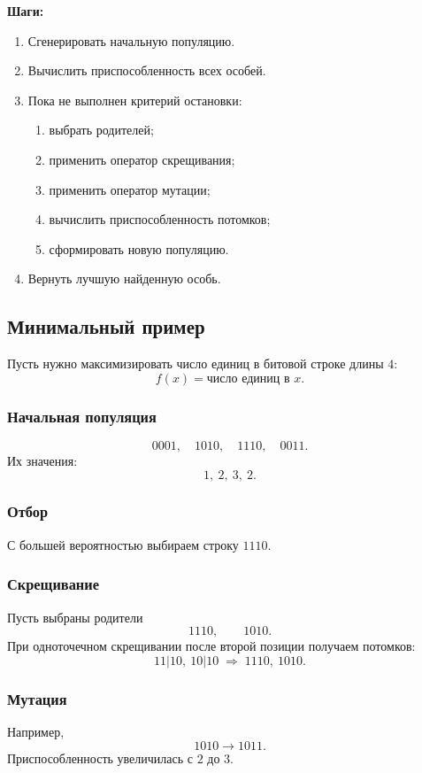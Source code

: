 \documentclass[12pt,a4paper]{article}
\theoremstyle{definition}
\theoremstyle{plain}
\begin{document}
\textbf{Шаги:}
\begin{enumerate}
\item Сгенерировать начальную популяцию.
\item Вычислить приспособленность всех особей.
\item Пока не выполнен критерий остановки:
\begin{enumerate}
\item выбрать родителей;
\item применить оператор скрещивания;
\item применить оператор мутации;
\item вычислить приспособленность потомков;
\item сформировать новую популяцию.
\end{enumerate}
\item Вернуть лучшую найденную особь.
\end{enumerate}

\subsection{Минимальный пример}
Пусть нужно максимизировать число единиц в битовой строке длины $4$:
\[
f(x)=\text{число единиц в }x.
\]

\subsubsection*{Начальная популяция}
\[
0001,\quad 1010,\quad 1110,\quad 0011.
\]
Их значения:
\[
1,\ 2,\ 3,\ 2.
\]

\subsubsection*{Отбор}
С большей вероятностью выбираем строку $1110$.

\subsubsection*{Скрещивание}
Пусть выбраны родители
\[
1110,\qquad 1010.
\]
При одноточечном скрещивании после второй позиции получаем потомков:
\[
11|10,\ 10|10 \;\Longrightarrow\; 1110,\ 1010.
\]

\subsubsection*{Мутация}
Например,
\[
1010\to 1011.
\]
Приспособленность увеличилась с $2$ до $3$.
\end{document}
